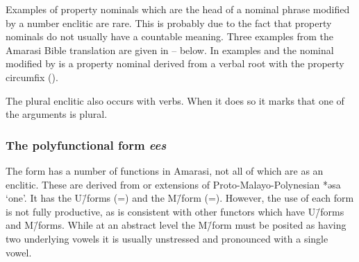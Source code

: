 Examples of property nominals which are the head of a nominal phrase
modified by a number enclitic are rare.
This is probably due to the fact that property nominals
do not usually have a countable meaning.
Three examples from the Amarasi Bible translation
are given in -- below.
In examples  and  the nominal
modified by  is a property nominal derived from
a verbal root with the property circumfix  ().

\begin{exe}
	\label{ex:Luke 8:17}
	\label{ex:Genesis 33:11}
	\label{ex:Genesis 24:22}
\end{exe}

The plural enclitic  also occurs with verbs.
When it does so it marks that one of the arguments is plural.

\subsubsection{The polyfunctional form \it{ees}}\label{sec:PolFunEs}
The form  has a number of functions in Amarasi,
not all of which are as an enclitic.
These are derived from or extensions of Proto-Malayo-Polynesian *əsa `one'.
It has the U\=/forms (=) and the M\=/form (=).
However, the use of each form is not fully productive,
as is consistent with other functors which have U\=/forms and M\=/forms.
While at an abstract level the M\=/form must be posited as having
two underlying vowels  it is usually unstressed
and pronounced with a single vowel.

